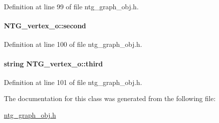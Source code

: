 Definition at line 99 of file ntg\_\-graph\_\-obj.h.

\paragraph[{second}]{ {\bf NTG\_\-vertex\_\-o::second}}\hfill\label{class_n_t_g__vertex__o_a46436455833920f013bb5d07f5ccd4e5}


Definition at line 100 of file ntg\_\-graph\_\-obj.h.

\paragraph[{third}]{\setlength{\rightskip}{0pt plus 5cm}string {\bf NTG\_\-vertex\_\-o::third}}\hfill\label{class_n_t_g__vertex__o_a39dc9c1f1c6becfd552f62702c51d714}


Definition at line 101 of file ntg\_\-graph\_\-obj.h.



The documentation for this class was generated from the following file:\begin{DoxyCompactItemize}
\item 
\hyperlink{ntg__graph__obj_8h}{ntg\_\-graph\_\-obj.h}\end{DoxyCompactItemize}
